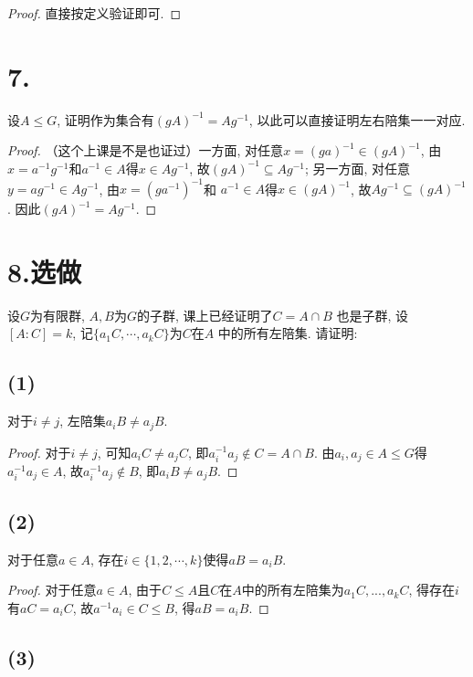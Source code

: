 \documentclass[12pt, a4paper, fontset=windows]{ctexart}
\newcommand{\kh}[1]{（{#1}）} %
\newcommand{\xuan}{{\normalsize 选做}}
\begin{document}
\begin{proof}
直接按定义验证即可. 
\end{proof}

\section*{7.}

设$A\le G$, 证明作为集合有$(gA)^{-1}=Ag^{-1}$, 
以此可以直接证明左右陪集一一对应. 

\begin{proof}
\kh{这个上课是不是也证过}一方面, 对任意$x=(ga)^{-1}\in(gA)^{-1}$, 
由$x=a^{-1}g^{-1}$和$a^{-1}\in A$得$x\in Ag^{-1}$, 故$(gA)^{-1}\subseteq Ag^{-1}$; 
另一方面, 对任意$y=ag^{-1}\in Ag^{-1}$, 由$x=(ga^{-1})^{-1}$和
$a^{-1}\in A$得$x\in(gA)^{-1}$, 故$Ag^{-1}\subseteq(gA)^{-1}$. 
因此$(gA)^{-1}=Ag^{-1}$. 
\end{proof}

\section*{8.\xuan}

设$G$为有限群, $A,B$为$G$的子群, 课上已经证明了$C=A\cap B$
也是子群, 设$[A:C]=k$, 记$\{a_1C,\cdots,a_kC\}$为$C$在$A$
中的所有左陪集. 请证明: 

\subsection*{(1)}

对于$i\ne j$, 左陪集$a_iB\ne a_jB$. 

\begin{proof}
对于$i\ne j$, 可知$a_iC\ne a_jC$, 即$a_i^{-1}a_j\notin C=A\cap B$. 
由$a_i,a_j\in A\le G$得$a_i^{-1}a_j\in A$, 故$a_i^{-1}a_j\notin B$, 
即$a_iB\ne a_jB$. 
\end{proof}

\subsection*{(2)}

对于任意$a\in A$, 存在$i\in\{1,2,\cdots,k\}$使得$aB=a_iB$. 

\begin{proof}
对于任意$a\in A$, 由于$C\le A$且$C$在$A$中的所有左陪集为$a_1C,...,a_kC$, 
得存在$i$有$aC=a_iC$, 故$a^{-1}a_i\in C\le B$, 得$aB=a_iB$. 
\end{proof}

\subsection*{(3)}
\end{document}
